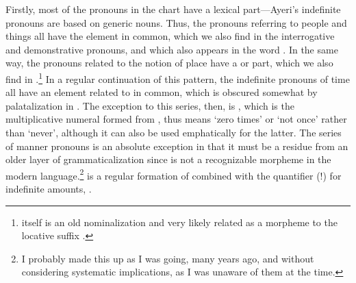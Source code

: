 Firstly, most of the pronouns in the chart have a lexical part---Ayeri's
indefinite pronouns are based on generic nouns. Thus, the pronouns referring to
people and things all have the  element in common, which we
also find in the interrogative and demonstrative pronouns, and which also
appears in the word . In the same way, the pronouns
related to the notion of place have a  or  part,
which we also find in .\footnote{ itself
is an old nominalization and very likely related as a morpheme to the locative
suffix .} In a regular continuation of this pattern, the
indefinite pronouns of time all have an element related to
 in common, which is obscured somewhat by palatalization
in . The exception to this series, then, is
, which is the multiplicative numeral formed from
, thus means `zero times' or `not once' rather than 
`never', although it can also be used emphatically for the latter. The series 
of manner pronouns is an absolute exception in that it must be a residue from 
an older layer of grammaticalization since  is not a 
recognizable morpheme in the modern language.\footnote{I probably made this up 
as I was going, many years ago, and without considering systematic 
implications, as I was unaware of them at the time.}  
is a regular formation of  combined with the 
quantifier (!) for indefinite amounts, .

